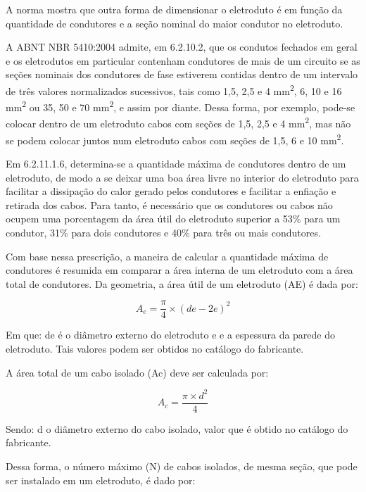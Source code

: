 A norma mostra que outra forma de dimensionar o eletroduto é em função da quantidade de condutores e a seção nominal do maior condutor no eletroduto. 

A ABNT NBR 5410:2004 admite, em 6.2.10.2, que os condutos fechados em geral e os eletrodutos em particular contenham condutores de mais de um circuito se as seções nominais dos condutores de fase estiverem contidas dentro de um intervalo de três valores normalizados sucessivos, tais como 1,5, 2,5 e 4 mm\textsuperscript{2}, 6, 10 e 16 mm\textsuperscript{2} ou 35, 50 e 70 mm\textsuperscript{2}, e assim por diante. Dessa forma, por exemplo, pode-se colocar dentro de um eletroduto cabos com seções de 1,5, 2,5 e 4 mm\textsuperscript{2}, mas não se podem colocar juntos num eletroduto cabos com seções de 1,5, 6 e 10 mm\textsuperscript{2}.

Em 6.2.11.1.6, determina-se a quantidade máxima de condutores dentro de um eletroduto, de modo a se deixar uma boa área livre no interior do eletroduto para facilitar a dissipação do calor gerado pelos condutores e facilitar a enfiação e retirada dos cabos. Para tanto, é necessário que os condutores ou cabos não ocupem uma porcentagem da área útil do eletroduto superior a 53\% para um condutor, 31\% para dois condutores e 40\% para três ou mais condutores.

Com base nessa prescrição, a maneira de calcular a quantidade máxima de condutores é resumida em comparar a área interna de um eletroduto com a área total de condutores. Da geometria, a área útil de um eletroduto (AE) é dada por:

\begin{equation}
	A_e = \frac{\pi}{4} \times \left(de - 2e\right) ^ 2
\end{equation}

Em que: de é o diâmetro externo do eletroduto e e a espessura da parede do eletroduto. Tais valores podem ser obtidos no catálogo do fabricante.
 

A área total de um cabo isolado (Ac) deve ser calculada por:

\begin{equation}
	A_c = \frac{\pi \times d ^ 2}{4}
\end{equation}

Sendo: d o diâmetro externo do cabo isolado, valor que é obtido no catálogo do fabricante.

Dessa forma, o número máximo (N) de cabos isolados, de mesma seção, que pode ser instalado em um eletroduto, é dado por:

